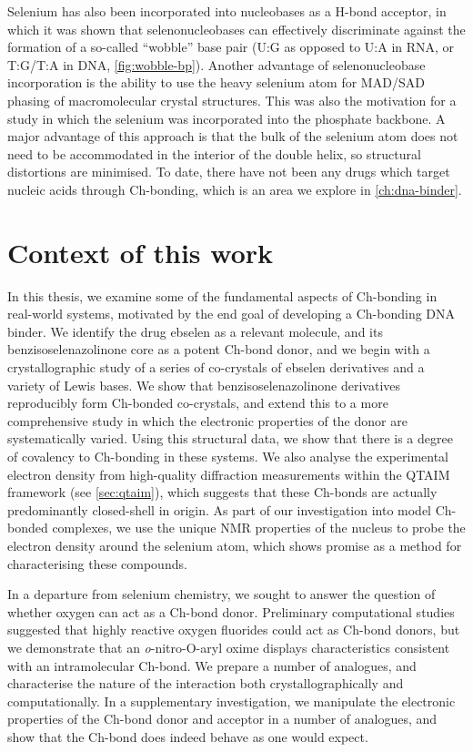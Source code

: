\begin{refsection}
Selenium has also been incorporated into nucleobases as a H-bond acceptor, in which it was shown that selenonucleobases can effectively discriminate against the formation of a so-called ``wobble'' base pair (U:G as opposed to U:A in RNA, or T:G/T:A in DNA, \cref{fig:wobble-bp}).\autocite{Hassan2010,Sun2012}
Another advantage of selenonucleobase incorporation is the ability to use the heavy selenium atom for MAD/SAD phasing of macromolecular crystal structures.\autocite{Salon2007}
This was also the motivation for a \citeyear{Conlon2019} study in which the selenium was incorporated into the phosphate backbone.\autocite{Conlon2019}
A major advantage of this approach is that the bulk of the selenium atom does not need to be accommodated in the interior of the double helix, so structural distortions are minimised.
To date, there have not been any drugs which target nucleic acids through Ch-bonding, which is an area we explore in \cref{ch:dna-binder}.

\section{Context of this work}
In this thesis, we examine some of the fundamental aspects of Ch-bonding in real-world systems, motivated by the end goal of developing a Ch-bonding DNA binder.
We identify the drug ebselen as a relevant molecule, and its benzisoselenazolinone core as a potent Ch-bond donor, and we begin with a crystallographic study of a series of co-crystals of ebselen derivatives and a variety of Lewis bases.
We show that benzisoselenazolinone derivatives reproducibly form Ch-bonded co-crystals, and extend this to a more comprehensive study in which the electronic properties of the donor are systematically varied.
Using this structural data, we show that there is a degree of covalency to Ch-bonding in these systems.
We also analyse the experimental electron density from high-quality diffraction measurements within the QTAIM framework (see \cref{sec:qtaim}), which suggests that these Ch-bonds are actually predominantly closed-shell in origin.
As part of our investigation into model Ch-bonded complexes, we use the unique NMR properties of the  nucleus to probe the electron density around the selenium atom, which shows promise as a method for characterising these compounds.

In a departure from selenium chemistry, we sought to answer the question of whether oxygen can act as a Ch-bond donor.
Preliminary computational studies suggested that highly reactive oxygen fluorides could act as Ch-bond donors\autocite{Varadwaj2019a}, but we demonstrate that an \textit{o}-nitro-O-aryl oxime displays characteristics consistent with an intramolecular  Ch-bond.
We prepare a number of analogues, and characterise the nature of the  interaction both crystallographically and computationally.
In a supplementary investigation, we manipulate the electronic properties of the Ch-bond donor and acceptor in a number of analogues, and show that the Ch-bond does indeed behave as one would expect.


\end{refsection}
